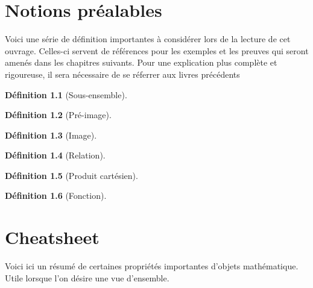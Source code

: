 \documentclass[12pt]{book}
\theoremstyle{definition}
\newtheorem{definition}{Définition}[section]
\begin{document}
\appendix
\chapter{Notions préalables}
Voici une série de définition importantes à considérer lors de la lecture de cet ouvrage. Celles-ci servent
de références pour les exemples et les preuves qui seront amenés dans les chapitres suivants. Pour une explication
plus complète et rigoureuse, il sera nécessaire de se réferrer aux livres précédents

\begin{definition}[Sous-ensemble]
    \label{def:sous_ensemble}
\end{definition}

\begin{definition}[Pré-image]
    \label{def:pre_image}
\end{definition}

\begin{definition}[Image]
    \label{def:image}
\end{definition}

\begin{definition}[Relation]
    \label{def:relation}
\end{definition}

\begin{definition}[Produit cartésien]
    \label{def:produit_cartesien}
\end{definition}

\begin{definition}[Fonction]
    \label{def:fonction}
\end{definition}

\chapter{Cheatsheet}
Voici ici un résumé de certaines propriétés importantes d'objets mathématique. Utile lorsque l'on désire une vue d'ensemble.
\end{document}
